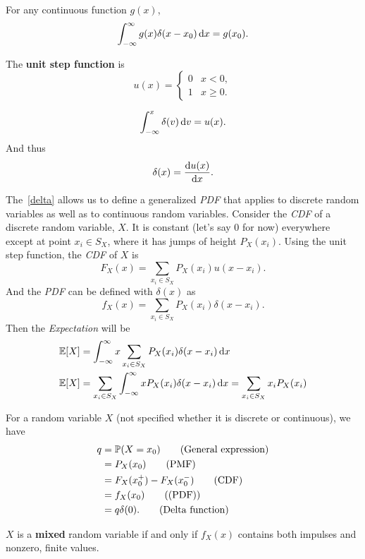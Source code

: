 \begin{theorem}
    For any continuous function $g(x)$,
    \[\int_{-\infty}^{\infty}g(x)\delta(x-x_0)\mathop{}\!\mathrm{d} x = g(x_0).\]
\end{theorem}

\begin{definition}
    The \textbf{unit step function} is
    \[u(x)={
        \begin{cases}
            0 & x<0, \\
            1 & x\geq 0.
        \end{cases}
    }\]
\end{definition}

\begin{theorem}\label{delta}
    \[\int_{-\infty}^{x}\delta(v)\mathop{}\!\mathrm{d} v = u(x).\]
    And thus
    \[\delta(x)=\frac{\mathop{}\!\mathrm{d} u(x)}{\mathop{}\!\mathrm{d} x}.\]
\end{theorem}

\begin{corollary}
    The~\cref{delta} allows us to define a generalized \emph{PDF} that applies to discrete random variables as well as to continuous random variables. Consider the \emph{CDF} of a discrete random variable, $X$. It is constant (let's say $0$ for now) everywhere except at point $x_i\in S_X$, where it has jumps of height $P_X(x_i)$. Using the unit step function, the \emph{CDF} of $X$ is
    \[F_X(x)=\sum_{x_i\in S_X} P_X(x_i)u(x-x_i).\]
    And the \emph{PDF} can be defined with $\delta(x)$ as
    \[f_X(x)=\sum_{x_i\in S_X}P_X(x_i)\delta(x-x_i).\]
    Then the \emph{Expectation} will be
    \begin{align*}
        \E{X} &= \int_{-\infty}^{\infty}x\sum_{x_i\in S_X}P_X(x_i)\delta(x-x_i)\diff x \\
        \E{X} &= \sum_{x_i\in S_X}\int_{-\infty}^{\infty}xP_X(x_i)\delta(x-x_i)\diff x = \sum_{x_i\in S_X}x_i P_X(x_i)
    \end{align*}
\end{corollary}

\begin{theorem}
    For a random variable $X$ (not specified whether it is discrete or continuous), we have
    \begin{align*}
        q
        &= \P{X=x_0}  \tag{General expression} \\
        &= P_X(x_0)  \tag{PMF} \\
        &= F_X(x_0^+) - F_X(x_0^-)  \tag{CDF} \\
        &= f_X(x_0)  \tag{(PDF)} \\
        &= q\delta(0).  \tag{Delta function}
    \end{align*}
\end{theorem}

\begin{theorem}
    $X$ is a \textbf{mixed} random variable if and only if $f_X(x)$ contains both impulses and nonzero, finite values.
\end{theorem}